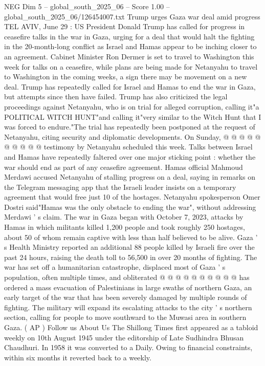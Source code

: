 \begin{textsample}{NEG Dim 5 – global\_south\_2025\_06 – Score 1.00 – global\_south\_2025\_06/126454007.txt}  \label{ex:f5_neg_392}
Trump urges Gaza war deal amid progress TEL AVIV, June 29 : US President Donald Trump has called for progress in ceasefire talks in the war in Gaza, urging for a deal that would halt the fighting in the 20-month-long conflict as Israel and Hamas appear to be inching closer to an agreement.
Cabinet Minister Ron Dermer is set to travel to Washington this week for talks on a ceasefire, while plans are being made for Netanyahu to travel to Washington in the coming weeks, a sign there may be movement on a new deal.
Trump has repeatedly called for Israel and Hamas to end the war in Gaza, but attempts since then have failed.
Trump has also criticized the legal proceedings against Netanyahu, who is on trial for alleged corruption, calling it"a POLITICAL WITCH HUNT"and calling it"very similar to the Witch Hunt that I was forced to endure."The trial has repeatedly been postponed at the request of Netanyahu, citing security and diplomatic developments.
On Sunday, @ @ @ @ @ @ @ @ @ @ testimony by Netanyahu scheduled this week.
Talks between Israel and Hamas have repeatedly faltered over one major sticking point : whether the war should end as part of any ceasefire agreement.
Hamas official Mahmoud Merdawi accused Netanyahu of stalling progress on a deal, saying in remarks on the Telegram messaging app that the Israeli leader insists on a temporary agreement that would free just 10 of the hostages.
Netanyahu spokesperson Omer Dostri said"Hamas was the only obstacle to ending the war", without addressing Merdawi ' s claim.
The war in Gaza began with October 7, 2023, attacks by Hamas in which militants killed 1,200 people and took roughly 250 hostages, about 50 of whom remain captive with less than half believed to be alive.
Gaza ' s Health Ministry reported an additional 88 people killed by Israeli fire over the past 24 hours, raising the death toll to 56,500 in over 20 months of fighting.
The war has set off a humanitarian catastrophe, displaced most of Gaza ' s population, often multiple times, and obliterated @ @ @ @ @ @ @ @ @ @ has ordered a mass evacuation of Palestinians in large swaths of northern Gaza, an early target of the war that has been severely damaged by multiple rounds of fighting.
The military will expand its escalating attacks to the city ' s northern section, calling for people to move southward to the Muwasi area in southern Gaza. ( AP ) Follow us About Us The Shillong Times first appeared as a tabloid weekly on 10th August 1945 under the editorship of Late Sudhindra Bhusan Chaudhuri.
In 1958 it was converted to a Daily.
Owing to financial constraints, within six months it reverted back to a weekly.

\end{textsample}
